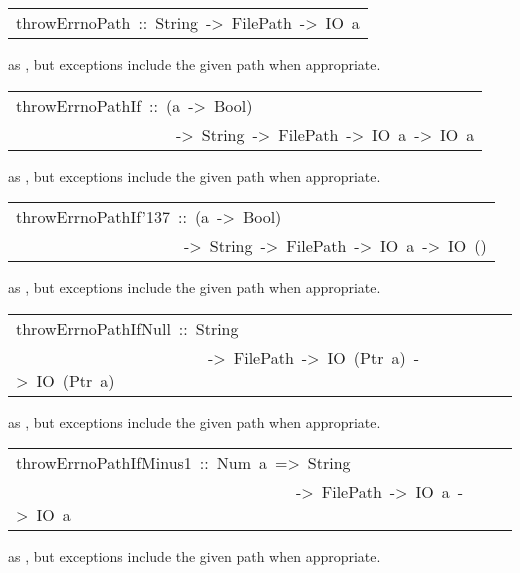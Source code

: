 \begin{haddockdesc}
\item[\begin{tabular}{@{}l}
throwErrnoPath\ ::\ String\ ->\ FilePath\ ->\ IO\ a
\end{tabular}]\haddockbegindoc
as , but exceptions include the given path when appropriate.
\par

\end{haddockdesc}
\begin{haddockdesc}
\item[\begin{tabular}{@{}l}
throwErrnoPathIf\ ::\ (a\ ->\ Bool)\\\ \ \ \ \ \ \ \ \ \ \ \ \ \ \ \ \ \ \ \ ->\ String\ ->\ FilePath\ ->\ IO\ a\ ->\ IO\ a
\end{tabular}]\haddockbegindoc
as , but exceptions include the given path when
   appropriate.
\par

\end{haddockdesc}
\begin{haddockdesc}
\item[\begin{tabular}{@{}l}
throwErrnoPathIf{\char '137}\ ::\ (a\ ->\ Bool)\\\ \ \ \ \ \ \ \ \ \ \ \ \ \ \ \ \ \ \ \ \ ->\ String\ ->\ FilePath\ ->\ IO\ a\ ->\ IO\ ()
\end{tabular}]\haddockbegindoc
as , but exceptions include the given path when
   appropriate.
\par

\end{haddockdesc}
\begin{haddockdesc}
\item[\begin{tabular}{@{}l}
throwErrnoPathIfNull\ ::\ String\\\ \ \ \ \ \ \ \ \ \ \ \ \ \ \ \ \ \ \ \ \ \ \ \ ->\ FilePath\ ->\ IO\ (Ptr\ a)\ ->\ IO\ (Ptr\ a)
\end{tabular}]\haddockbegindoc
as , but exceptions include the given path when
   appropriate.
\par

\end{haddockdesc}
\begin{haddockdesc}
\item[\begin{tabular}{@{}l}
throwErrnoPathIfMinus1\ ::\ Num\ a\ =>\ String\\\ \ \ \ \ \ \ \ \ \ \ \ \ \ \ \ \ \ \ \ \ \ \ \ \ \ \ \ \ \ \ \ \ \ \ ->\ FilePath\ ->\ IO\ a\ ->\ IO\ a
\end{tabular}]\haddockbegindoc
as , but exceptions include the given path when
   appropriate.
\par

\end{haddockdesc}
